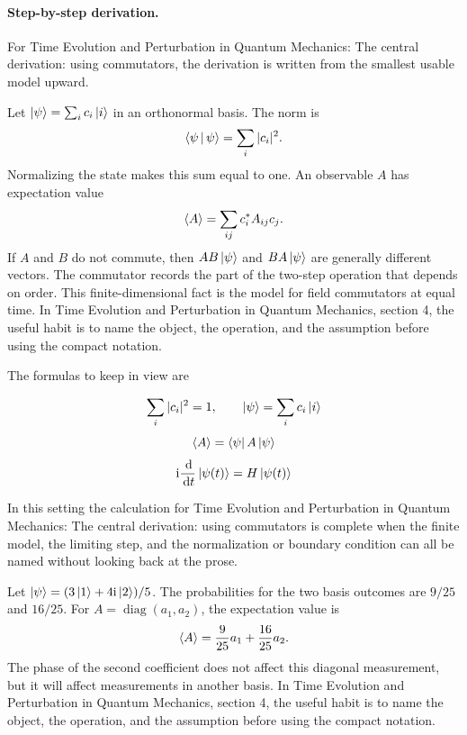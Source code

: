\paragraph{Step-by-step derivation.}

For Time Evolution and Perturbation in Quantum Mechanics: The central derivation: using commutators, the derivation is written from the smallest usable model upward.

Let \(\left|\psi\right\rangle=\sum_i c_i\left|i\right\rangle\) in an orthonormal basis.  The norm is
\[
  \left\langle \psi\,\middle|\,\psi\right\rangle=\sum_i |c_i|^2.
\]
Normalizing the state makes this sum equal to one.  An observable \(A\) has expectation value
\[
  \left\langle A\right\rangle=\sum_{ij}c_i^*A_{ij}c_j.
\]
If \(A\) and \(B\) do not commute, then \(AB\left|\psi\right\rangle\) and \(BA\left|\psi\right\rangle\) are generally different vectors.  The commutator records the part of the two-step operation that depends on order.  This finite-dimensional fact is the model for field commutators at equal time.  In Time Evolution and Perturbation in Quantum Mechanics, section 4, the useful habit is to name the object, the operation, and the assumption before using the compact notation.

The formulas to keep in view are

\[
  \sum_i |c_i|^2=1,\qquad \left|\psi\right\rangle=\sum_i c_i\left|i\right\rangle
\]
\[
  \left\langle A\right\rangle=\left\langle \psi\right|A\left|\psi\right\rangle
\]
\[
  \mathrm i\frac{\,\mathrm d}{\,\mathrm d t}\left|\psi(t)\right\rangle=H\left|\psi(t)\right\rangle
\]

In this setting the calculation for Time Evolution and Perturbation in Quantum Mechanics: The central derivation: using commutators is complete when the finite model, the limiting step, and the normalization or boundary condition can all be named without looking back at the prose.




\begin{example}
Let \(\left|\psi\right\rangle=(3\left|1\right\rangle+4\mathrm i\left|2\right\rangle)/5\).  The probabilities for the two basis outcomes are \(9/25\) and \(16/25\).  For \(A=\operatorname{diag}(a_1,a_2)\), the expectation value is
\[
  \left\langle A\right\rangle=\frac{9}{25}a_1+\frac{16}{25}a_2.
\]
The phase of the second coefficient does not affect this diagonal measurement, but it will affect measurements in another basis.  In Time Evolution and Perturbation in Quantum Mechanics, section 4, the useful habit is to name the object, the operation, and the assumption before using the compact notation.
\end{example}



